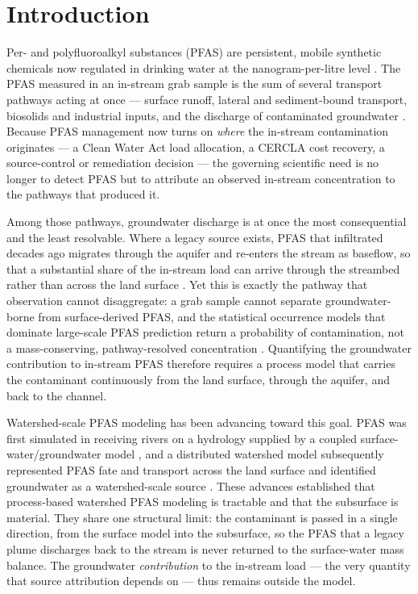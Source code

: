 \section{Introduction}

Per- and polyfluoroalkyl substances (PFAS) are persistent, mobile synthetic chemicals now regulated in
drinking water at the nanogram-per-litre level \citep{buck2011, guelfo2021, epa2024mcl}. The PFAS
measured in an in-stream grab sample is the sum of several transport pathways acting at once --- surface
runoff, lateral and sediment-bound transport, biosolids and industrial inputs, and the discharge of
contaminated groundwater \citep{prevedouros2006, sepulvado2011}. Because PFAS management now turns on
\emph{where} the in-stream contamination originates --- a Clean Water Act load allocation, a CERCLA cost
recovery, a source-control or remediation decision \citep{epa2024cercla, egle2022rule57} --- the
governing scientific need is no longer to detect PFAS but to attribute an observed in-stream
concentration to the pathways that produced it.

Among those pathways, groundwater discharge is at once the most consequential and the least resolvable.
Where a legacy source exists, PFAS that infiltrated decades ago migrates through the aquifer and
re-enters the stream as baseflow, so that a substantial share of the in-stream load can arrive through
the streambed rather than across the land surface \citep{rafiei2023pfas}. Yet this is exactly the
pathway that observation cannot disaggregate: a grab sample cannot separate groundwater-borne from
surface-derived PFAS, and the statistical occurrence models that dominate large-scale PFAS prediction
return a probability of contamination, not a mass-conserving, pathway-resolved concentration
\citep{tokranov2024groundwater}. Quantifying the groundwater contribution to in-stream PFAS therefore
requires a process model that carries the contaminant continuously from the land surface, through the
aquifer, and back to the channel.

Watershed-scale PFAS modeling has been advancing toward this goal. PFAS was first simulated in receiving
rivers on a hydrology supplied by a coupled surface-water/groundwater model \citep{raschke2022integrated},
and a distributed watershed model subsequently represented PFAS fate and transport across the land
surface and identified groundwater as a watershed-scale source \citep{rafiei2023pfas}. These advances
established that process-based watershed PFAS modeling is tractable and that the subsurface is material.
They share one structural limit: the contaminant is passed in a single direction, from the surface
model into the subsurface, so the PFAS that a legacy plume discharges back to the stream is never
returned to the surface-water mass balance. The groundwater \emph{contribution} to the in-stream load
--- the very quantity that source attribution depends on --- thus remains outside the model.

